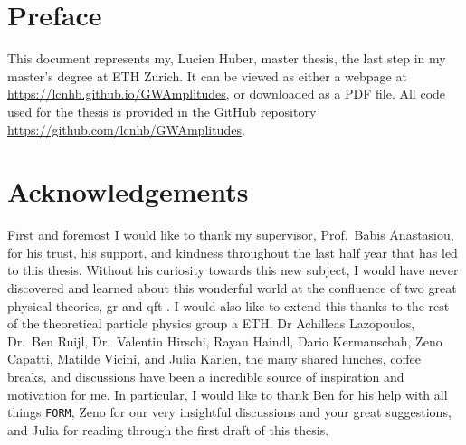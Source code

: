 \documentclass[
  11pt,
  a4paper,
  DIV=11,
  numbers=noendperiod,
  twoside]{scrreprt}
\DeclareRobustCommand{\[}{\begin{equation}}
\DeclareRobustCommand{\]}{\end{equation}}
\renewcommand*\contentsname{Table of contents}
\newcommand\contentsname{Table of contents}
\begin{document}

\newcommand{\texttip}[2]{#1}
\newcommand{\mathtip}[2]{#1}

\ifdefined\Shaded\renewenvironment{Shaded}{\begin{tcolorbox}[sharp corners, interior hidden, boxrule=0pt, frame hidden, breakable, enhanced, borderline west={3pt}{0pt}{shadecolor}]}{\end{tcolorbox}}\fi

\renewcommand*\contentsname{Table of contents}
{
\hypersetup{linkcolor=}
\setcounter{tocdepth}{2}
\tableofcontents
}

\hypertarget{preface}{%
\chapter*{Preface}\label{preface}}

This document represents my, Lucien Huber, master thesis, the last step
in my master's degree at ETH Zurich. It can be viewed as either a
webpage at \url{https://lcnhb.github.io/GWAmplitudes}, or downloaded as
a PDF file. All code used for the thesis is provided in the GitHub
repository \url{https://github.com/lcnhb/GWAmplitudes}.


\hypertarget{acknowledgements}{%
\chapter*{Acknowledgements}\label{acknowledgements}}

First and foremost I would like to thank my supervisor, Prof.~Babis
Anastasiou, for his trust, his support, and kindness throughout the last
half year that has led to this thesis. Without his curiosity towards
this new subject, I would have never discovered and learned about this
wonderful world at the confluence of two great physical theories,
\gls{gr} and \gls{qft} . I would also like to extend this thanks to the
rest of the theoretical particle physics group a ETH. Dr Achilleas
Lazopoulos, Dr.~Ben Ruijl, Dr.~Valentin Hirschi, Rayan Haindl, Dario
Kermanschah, Zeno Capatti, Matilde Vicini, and Julia Karlen, the many
shared lunches, coffee breaks, and discussions have been a incredible
source of inspiration and motivation for me. In particular, I would like
to thank Ben for his help with all things \texttt{FORM}, Zeno for our
very insightful discussions and your great suggestions, and Julia for
reading through the first draft of this thesis.
\end{document}
